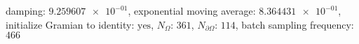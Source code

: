 damping: $\num[scientific-notation=true]{9.259607e-01}$, exponential moving average: $\num[scientific-notation=true]{8.364431e-01}$, initialize Gramian to identity: $\text{yes}$, $N_{\Omega}$: $\num[scientific-notation=false]{361}$, $N_{\partial\Omega}$: $\num[scientific-notation=false]{114}$, batch sampling frequency: $\num[scientific-notation=false]{466}$